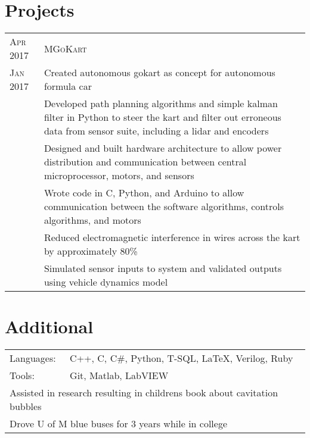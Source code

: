 \documentclass[a4paper,12pt]{article} %
\begin{document}

\section{Projects}

\begin{tabular}{R{2.1cm}|p{15.5cm}}
\hspace{4pt}\textsc{Apr 2017} & \textsc{MGoKart} \\
\textsc{Jan 2017} & \footnotesize{Created autonomous gokart as concept for
 autonomous formula car} \\
& \footnotesize{Developed path planning algorithms and simple kalman filter in
  Python to steer the kart and filter out erroneous data from sensor suite,
  including a lidar and encoders} \\
& \footnotesize{Designed and built hardware architecture to allow power
 distribution and communication between central microprocessor, motors, and
 sensors} \\
& \footnotesize{Wrote code in C, Python, and Arduino to allow communication
 between the software algorithms, controls algorithms, and motors} \\
& \footnotesize{Reduced electromagnetic interference in wires across the kart by
 approximately 80\%} \\
& \footnotesize{Simulated sensor inputs to system and validated outputs using
 vehicle dynamics model} \\
\end{tabular}


\section{Additional}

\begin{tabular}{ll}
Languages: & C++, C, C\#, Python, T-SQL, \LaTeX, Verilog, Ruby \\
Tools: & Git, Matlab, LabVIEW \\
\multicolumn{2}{l}{Assisted in research resulting in childrens book about
  cavitation bubbles}\\
\multicolumn{2}{l}{Drove U of M blue buses for 3 years while in college}\\
\end{tabular}

\clearpage %

\end{document}
